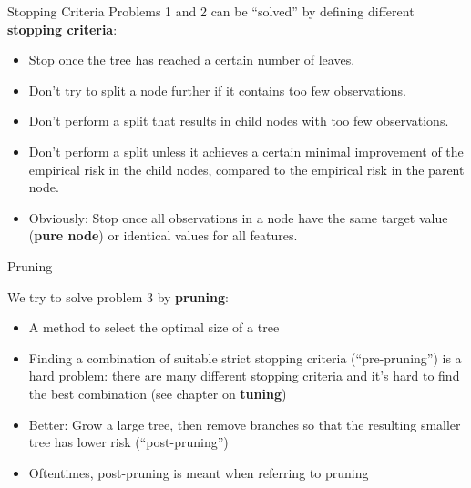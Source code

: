 \documentclass[11pt,compress,t,notes=noshow, xcolor=table]{beamer}
\begin{document}
\begin{vbframe}{Stopping Criteria}
Problems 1 and 2 can be \enquote{solved} by defining different \textbf{stopping criteria}:
  \begin{itemize}
    \item Stop once the tree has reached a certain number of leaves.
    \item Don't try to split a node further if it contains too few observations.
    \item Don't perform a split that results in child nodes with too few observations.
    \item Don't perform a split unless it achieves a certain minimal improvement of the empirical risk in the child nodes, compared to the empirical risk in the parent node.
    \item Obviously: Stop once all observations in a node have the same target value (\textbf{pure node}) or identical values for all features. 
  \end{itemize}
\end{vbframe}

\begin{vbframe}{Pruning}

We try to solve problem 3 by \textbf{pruning}:

\begin{itemize}
\item A method to select the optimal size of a tree
\item Finding a combination of suitable strict stopping criteria (\enquote{pre-pruning}) is a hard problem: there are many different stopping criteria and it's hard to find the best combination (see chapter on \textbf{tuning})
\item Better: Grow a large tree, then remove branches so that the resulting smaller tree has lower risk (\enquote{post-pruning})
\item Oftentimes, post-pruning is meant when referring to pruning

\end{itemize}
\end{vbframe}
\end{document}
